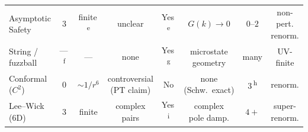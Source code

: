 \begin{table}[p]
\begin{adjustbox}{max width=\textwidth}
\begin{tabular}{@{} l c c c c c c c @{}}
Asymptotic Safety
  & $3$
  & finite\,\textsuperscript{e}
  & unclear
  & \textcolor{resolved}{Yes}\,\textsuperscript{e}
  & $G(k)\!\to\!0$
  & $0$--$2$
  & \makecell{non-pert.\\[-2pt]renorm.}\\

String / fuzzball
  & ---\,\textsuperscript{f}
  & ---
  & none
  & \textcolor{resolved}{Yes}\,\textsuperscript{g}
  & \makecell{microstate\\[-2pt]geometry}
  & many
  & UV-finite\\

Conformal ($C^2$)
  & $0$
  & $\sim 1/r^6$
  & \makecell{controversial\\[-2pt]\scriptsize(PT claim)}
  & \textcolor{notresolved}{No}
  & \makecell{none\\[-2pt]\scriptsize(Schw.\ exact)}
  & $3$\,\textsuperscript{h}
  & renorm.\\

Lee--Wick (6D)
  & $3$
  & finite
  & \makecell{complex\\[-2pt]pairs}
  & \textcolor{resolved}{Yes}\,\textsuperscript{i}
  & \makecell{complex\\[-2pt]pole damp.}
  & $4{+}$
  & super-renorm.\\

\bottomrule
\end{tabular}
\end{adjustbox}


\end{table}
